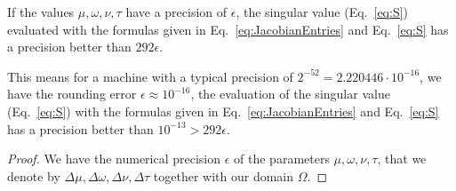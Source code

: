 \documentclass{article}
\begin{document}
\begin{lemma}
If the values $\mu, \omega, \nu, \tau$ have a precision of $\epsilon$, 
the singular value (Eq.~\eqref{eq:S}) evaluated with the formulas 
given in Eq.~\eqref{eq:JacobianEntries} and Eq.~\eqref{eq:S} has 
a precision better than $292 \epsilon$.  
\end{lemma}

This means for a machine with a typical precision of $2^{-52}=2.220446 \cdot 10^{-16}$, we have the rounding error $\epsilon \approx 10^{-16}$, the evaluation 
of the singular value (Eq.~\eqref{eq:S}) with the formulas given in Eq.~\eqref{eq:JacobianEntries} and Eq.~\eqref{eq:S} has 
a precision better than $ 10^{-13} > 292 \epsilon $.

\begin{proof}
We have the numerical precision $\epsilon$ of the parameters $\mu, \omega, \nu, \tau$, that we denote by
$\Delta \mu, \Delta \omega, \Delta \nu, \Delta \tau$ together with our domain $\Omega$.


\end{proof}
\end{document}
